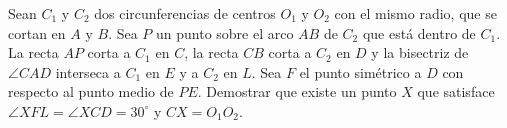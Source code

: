 Sean $C_1$ y $C_2$ dos circunferencias de centros $O_1$ y $O_2$ con el mismo radio, que se cortan en $A$ y $B$. Sea $P$ un punto sobre el arco $AB$ de $C_2$ que está dentro de $C_1$. La recta $AP$ corta a $C_1$ en $C$, la recta $CB$ corta a $C_2$ en $D$ y la bisectriz de $\angle CAD$ interseca a $C_1$ en $E$ y a $C_2$ en $L$. Sea $F$ el punto simétrico a $D$ con respecto al punto medio de $PE$. Demostrar que existe un punto $X$ que satisface $\angle XFL = \angle XCD = 30^{\circ}$ y $CX = O_1 O_2$.
